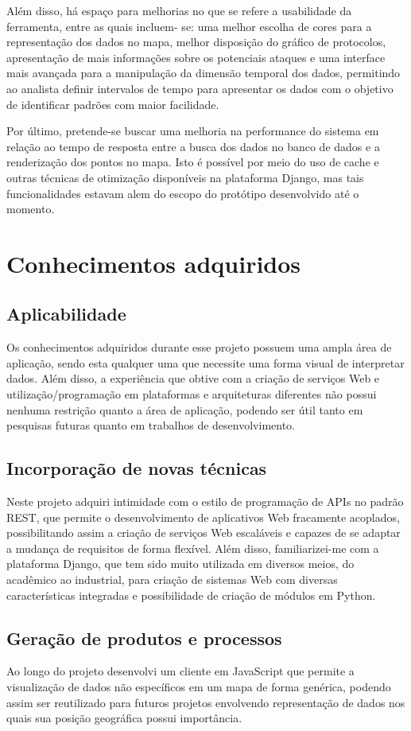 \documentclass[%
        Portuguese,%
        ]
{ic-tese-v2}
\begin{document}
Além disso, há espaço para melhorias no que se refere a usabilidade da ferramenta, entre as quais incluem- se: uma melhor escolha de cores para a representação dos dados no mapa, melhor disposição do gráfico de protocolos, apresentação de mais informações sobre os potenciais ataques e uma interface mais avançada para a manipulação da dimensão temporal dos dados, permitindo ao analista definir intervalos de tempo para apresentar os dados com o objetivo de identificar padrões com maior facilidade.

Por último, pretende-se buscar uma melhoria na performance do sistema em relação ao tempo de resposta entre a busca dos dados no banco de dados e a renderização dos pontos no mapa. Isto é possível por meio do uso de cache e outras técnicas de otimização disponíveis na plataforma Django, mas tais funcionalidades estavam alem do escopo do protótipo desenvolvido até o momento.


\chapter{Conhecimentos adquiridos}
\section{Aplicabilidade}
Os conhecimentos adquiridos durante esse projeto possuem uma ampla área de aplicação, sendo esta qualquer uma que necessite uma forma visual de interpretar dados. Além disso, a experiência que obtive com a criação de serviços Web e utilização/programação em plataformas e arquiteturas diferentes não possui nenhuma restrição quanto a área de aplicação, podendo ser útil tanto em pesquisas futuras quanto em trabalhos de desenvolvimento.

\section{Incorporação de novas técnicas}
Neste projeto adquiri intimidade com o estilo de programação de APIs no padrão REST, que permite o desenvolvimento de aplicativos Web fracamente acoplados, possibilitando assim a criação de serviços Web escaláveis e capazes de se adaptar a mudança de requisitos de forma flexível. Além disso, familiarizei-me com a plataforma Django, que tem sido muito utilizada em diversos meios, do acadêmico ao industrial, para criação de sistemas Web com diversas características integradas e possibilidade de criação de módulos em Python.

\section{Geração de produtos e processos}
Ao longo do projeto desenvolvi um cliente em JavaScript que permite a visualização de dados não específicos em um mapa de forma genérica, podendo assim ser reutilizado para futuros projetos envolvendo representação de dados nos quais sua posição geográfica possui importância.
\end{document}
